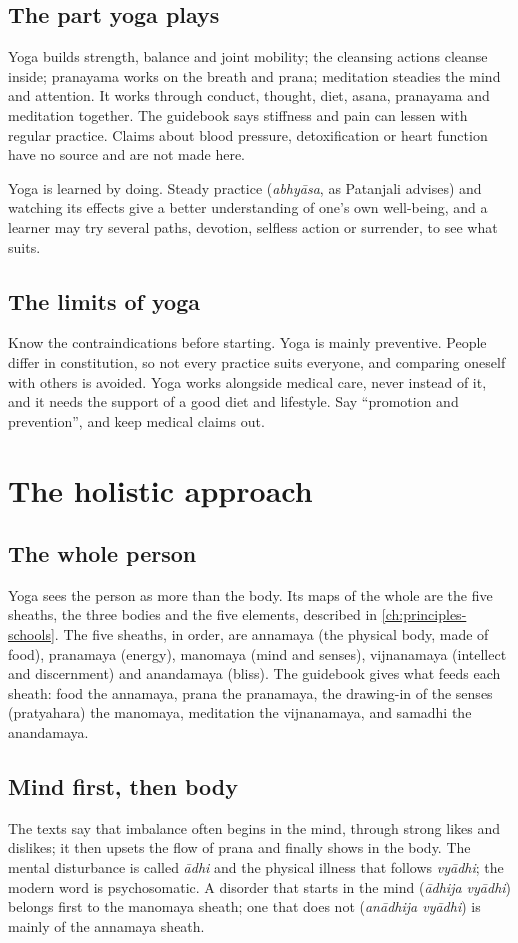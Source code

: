 \subsection*{The part yoga plays}
Yoga builds strength, balance and joint mobility; the cleansing actions cleanse inside; pranayama works on the breath and prana; meditation steadies the mind and attention. It works through conduct, thought, diet, asana, pranayama and meditation together. The guidebook says stiffness and pain can lessen with regular practice. Claims about blood pressure, detoxification or heart function have no source and are not made here.

Yoga is learned by doing. Steady practice (\emph{abhyāsa}, as Patanjali advises) and watching its effects give a better understanding of one's own well-being, and a learner may try several paths, devotion, selfless action or surrender, to see what suits.

\subsection*{The limits of yoga}
Know the contraindications before starting. Yoga is mainly preventive. People differ in constitution, so not every practice suits everyone, and comparing oneself with others is avoided. Yoga works alongside medical care, never instead of it, and it needs the support of a good diet and lifestyle. Say ``promotion and prevention'', and keep medical claims out.

\section{The holistic approach}

\subsection*{The whole person}
Yoga sees the person as more than the body. Its maps of the whole are the five sheaths, the three bodies and the five elements, described in \cref{ch:principles-schools}. The five sheaths, in order, are annamaya (the physical body, made of food), pranamaya (energy), manomaya (mind and senses), vijnanamaya (intellect and discernment) and anandamaya (bliss). The guidebook gives what feeds each sheath: food the annamaya, prana the pranamaya, the drawing-in of the senses (pratyahara) the manomaya, meditation the vijnanamaya, and samadhi the anandamaya.

\subsection*{Mind first, then body}
The texts say that imbalance often begins in the mind, through strong likes and dislikes; it then upsets the flow of prana and finally shows in the body. The mental disturbance is called \emph{ādhi} and the physical illness that follows \emph{vyādhi}; the modern word is psychosomatic. A disorder that starts in the mind (\emph{ādhija vyādhi}) belongs first to the manomaya sheath; one that does not (\emph{anādhija vyādhi}) is mainly of the annamaya sheath.

